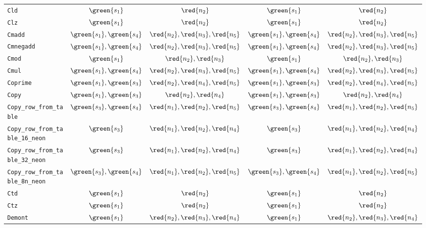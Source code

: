 \begin{table}[p]
\begin{adjustbox}{max width=\textwidth}
\begin{tabular}{l  cc || cc}
    \texttt{Cld} & $ \green{s_1}$ & $ \red{n_2}$ & $ \green{s_1}$ & $ \red{n_2}$ \\
    \texttt{Clz} & $ \green{s_1}$ & $ \red{n_2}$ & $ \green{s_1}$ & $ \red{n_2}$ \\
    \texttt{Cmadd} & $ \green{s_1}, \green{s_4}$ & $ \red{n_2}, \red{n_3}, \red{n_5}$ & $ \green{s_1}, \green{s_4}$ & $ \red{n_2}, \red{n_3}, \red{n_5}$ \\
    \texttt{Cmnegadd} & $ \green{s_1}, \green{s_4}$ & $ \red{n_2}, \red{n_3}, \red{n_5}$ & $ \green{s_1}, \green{s_4}$ & $ \red{n_2}, \red{n_3}, \red{n_5}$ \\
    \texttt{Cmod} & $ \green{s_1}$ & $ \red{n_2}, \red{n_3}$ & $ \green{s_1}$ & $ \red{n_2}, \red{n_3}$ \\
    \texttt{Cmul} & $ \green{s_1}, \green{s_4}$ & $ \red{n_2}, \red{n_3}, \red{n_5}$ & $ \green{s_1}, \green{s_4}$ & $ \red{n_2}, \red{n_3}, \red{n_5}$ \\
    \texttt{Coprime} & $ \green{s_1}, \green{s_3}$ & $ \red{n_2}, \red{n_4}, \red{n_5}$ & $ \green{s_1}, \green{s_3}$ & $ \red{n_2}, \red{n_4}, \red{n_5}$ \\
    \texttt{Copy} & $ \green{s_1}, \green{s_3}$ & $ \red{n_2}, \red{n_4}$ & $ \green{s_1}, \green{s_3}$ & $ \red{n_2}, \red{n_4}$ \\
    \texttt{Copy\_row\_from\_table} & $ \green{s_3}, \green{s_4}$ & $ \red{n_1}, \red{n_2}, \red{n_5}$ & $ \green{s_3}, \green{s_4}$ & $ \red{n_1}, \red{n_2}, \red{n_5}$ \\
    \texttt{Copy\_row\_from\_table\_16\_neon} & $ \green{s_3}$ & $ \red{n_1}, \red{n_2}, \red{n_4}$ & $ \green{s_3}$ & $ \red{n_1}, \red{n_2}, \red{n_4}$ \\
    \texttt{Copy\_row\_from\_table\_32\_neon} & $ \green{s_3}$ & $ \red{n_1}, \red{n_2}, \red{n_4}$ & $ \green{s_3}$ & $ \red{n_1}, \red{n_2}, \red{n_4}$ \\
    \texttt{Copy\_row\_from\_table\_8n\_neon} & $ \green{s_3}, \green{s_4}$ & $ \red{n_1}, \red{n_2}, \red{n_5}$ & $ \green{s_3}, \green{s_4}$ & $ \red{n_1}, \red{n_2}, \red{n_5}$ \\
    \texttt{Ctd} & $ \green{s_1}$ & $ \red{n_2}$ & $ \green{s_1}$ & $ \red{n_2}$ \\
    \texttt{Ctz} & $ \green{s_1}$ & $ \red{n_2}$ & $ \green{s_1}$ & $ \red{n_2}$ \\
    \texttt{Demont} & $ \green{s_1}$ & $ \red{n_2}, \red{n_3}, \red{n_4}$ & $ \green{s_1}$ & $ \red{n_2}, \red{n_3}, \red{n_4}$ \\

\end{tabular}
\end{adjustbox}
\end{table}
